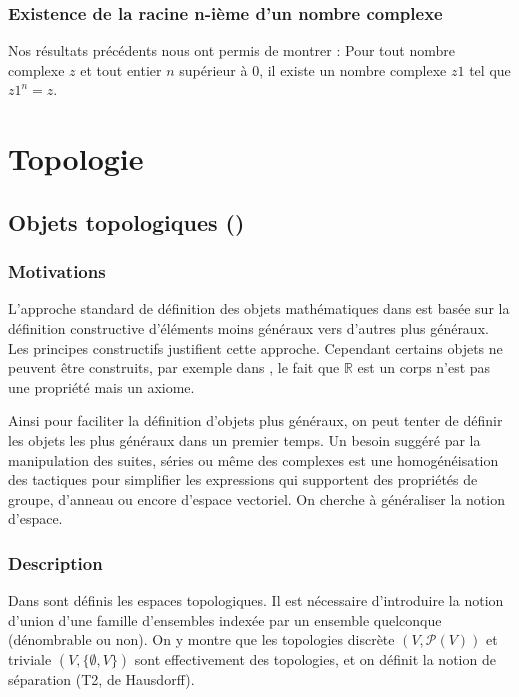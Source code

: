 \subsubsection{Existence de la racine n-ième d'un nombre complexe}
Nos résultats précédents nous ont permis de montrer :
Pour tout nombre complexe $z$ et tout entier $n$ supérieur à $0$, il existe un nombre complexe $z1$ tel que $z1 ^ n = z$.

\section{Topologie}

\subsection{Objets topologiques ()}

\subsubsection{Motivations}

L'approche standard de définition des objets mathématiques dans \Coq{} est basée sur la définition constructive d'éléments moins généraux vers d'autres plus généraux. Les principes constructifs justifient cette approche. Cependant certains objets ne peuvent être construits, par exemple dans , le fait que $\mathbb{R}$ est un corps n'est pas une propriété mais un axiome.

Ainsi pour faciliter la définition d'objets plus généraux, on peut tenter de définir les objets les plus généraux dans un premier temps. Un besoin suggéré par la manipulation des suites, séries ou même des complexes est une homogénéisation des tactiques pour simplifier les expressions qui supportent des propriétés de groupe, d'anneau ou encore d'espace vectoriel. On cherche à généraliser la notion d'espace.

\subsubsection{Description}

Dans  sont définis les espaces topologiques. Il est nécessaire d'introduire la notion d'union d'une famille d'ensembles indexée par un ensemble quelconque (dénombrable ou non). On y montre que les topologies discrète $(V,\mathcal{P}(V))$ et triviale $(V,\{\emptyset,V\})$ sont effectivement des topologies, et on définit la notion de séparation (T2, de Hausdorff).

